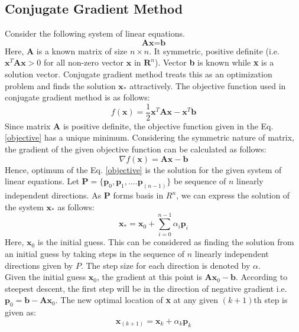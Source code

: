 \documentclass[sigplan,screen]{acmart}
\begin{document}
\subsection{Conjugate Gradient Method}
Consider the following system of linear equations.
\begin{equation}
\textbf{Ax}=\textbf{b}
\end{equation}
Here, \textbf{A} is a known matrix of size $n\times n$. It symmetric, positive definite (i.e. $\textbf{x}^T\textbf{A}\textbf{x} >0$ for all non-zero vector $\textbf{x}$ in $\textbf{R}^n$). Vector \textbf{b} is known while \textbf{x} is a solution vector. Conjugate gradient method treats this as an optimization problem and finds the solution $\textbf{x}_*$ attractively. The objective function used in conjugate gradient method is as follows:
\begin{equation}\label{objective}
f(\textbf{x})= \frac{1}{2}\textbf{x}^T\textbf{A}\textbf{x}-\textbf{x}^T\textbf{b}
\end{equation}
Since matrix \textbf{A} is positive definite, the objective function given in the Eq. \eqref{objective} has a unique minimum. Considering the symmetric nature of matrix, the gradient of the given objective function can be calculated as follows:
\begin{equation}
\nabla f({\textbf{x}}) = \textbf{Ax}-\textbf{b}
\end{equation}
Hence, optimum of the Eq. \eqref{objective} is the solution for the given system of linear equations.
Let $\textbf{P}=\{\textbf{p}_0, \textbf{p}_1, ....\textbf{p}_{(n-1)}\}$ be sequence of $n$ linearly independent directions. As $\textbf{P}$ forms basis in $R^n$, we can express the solution of the system $\textbf{x}_*$ as follows:
\begin{equation}
\textbf{x}_*= \textbf{x}_0 + \sum_{i=0}^{n-1}\alpha_i\textbf{p}_i
\end{equation}
Here, $\textbf{x}_0$ is the initial guess. This can be considered as finding the solution from an initial guess by taking steps in the sequence of $n$ linearly independent directions given by $P$. The step size for each direction is denoted by $\alpha$.\\
Given the initial guess $\textbf{x}_0$, the gradient at this point is $\textbf{Ax}_0-\textbf{b}$. According to steepest descent, the first step will be in the direction of negative gradient i.e. $\textbf{p}_0= \textbf{b}-\textbf{Ax}_0$. The new optimal location of \textbf{x} at any given $(k+1)$th step is given as:
\begin{equation}
\textbf{x}_{(k+1)}=\textbf{x}_k+\alpha_k\textbf{p}_k
\end{equation}
\end{document}
